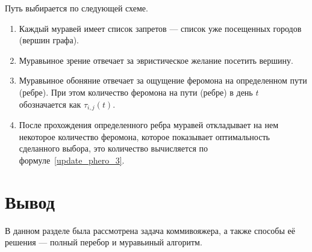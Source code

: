 Путь выбирается по следующей схеме.
\begin{enumerate}
	\item Каждый муравей имеет список запретов --- список уже посещенных городов (вершин графа).
	\item Муравьиное зрение отвечает за эвристическое желание посетить вершину.
	\item Муравьиное обоняние отвечает за ощущение феромона на определенном пути (ребре). При этом количество феромона на пути (ребре) в день $t$ обозначается как $\tau_{i, j} (t)$.
	\item После прохождения определенного ребра муравей откладывает на нем некоторое количество феромона, которое показывает оптимальность сделанного выбора, это количество вычисляется по формуле~\eqref{update_phero_3}.
\end{enumerate}

\section*{Вывод}

В данном разделе была рассмотрена задача коммивояжера, а также способы её решения --- полный перебор и муравьиный алгоритм.